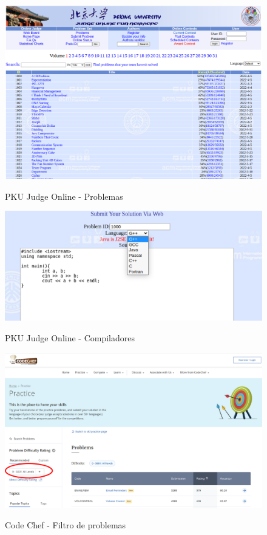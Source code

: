 \begin{anexosenv}
\begin{figure}[H]
    \centering
    \caption{PKU Judge Online - Problemas}
    \includegraphics[keepaspectratio=true,scale=0.35]{figuras/pku.eps}
    \label{fig:pku}
\end{figure}

\begin{figure}[H]
    \centering
    \caption{PKU Judge Online - Compiladores}
    \includegraphics[keepaspectratio=true,scale=0.4]{figuras/pku_2.eps}
    \label{fig:pku_2}
\end{figure}

\begin{figure}[H]
    \centering
    \caption{Code Chef - Filtro de problemas}
    \includegraphics[keepaspectratio=true,scale=0.3]{figuras/code_chef_1.eps}
    \label{fig:code_chef_1}
\end{figure}


\end{anexosenv}
